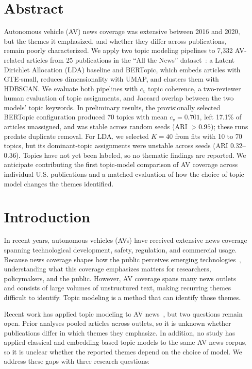 \documentclass[conference]{IEEEtran}
\begin{document}
\section*{Abstract}
Autonomous vehicle (AV) news coverage was extensive between 2016 and 2020, but the themes it emphasized, and whether they differ across publications, remain poorly characterized. We apply two topic modeling pipelines to 7,332 AV-related articles from 25 publications in the ``All the News'' dataset~\cite{mckinley2021}: a Latent Dirichlet Allocation (LDA) baseline and BERTopic, which embeds articles with GTE-small, reduces dimensionality with UMAP, and clusters them with HDBSCAN. We evaluate both pipelines with $c_v$ topic coherence, a two-reviewer human evaluation of topic assignments, and Jaccard overlap between the two models' topic keywords. In preliminary results, the provisionally selected BERTopic configuration produced 70 topics with mean $c_v=0.701$, left 17.1\% of articles unassigned, and was stable across random seeds (ARI $>0.95$); these runs predate duplicate removal. For LDA, we selected $K=40$ from fits with 10 to 70 topics, but its dominant-topic assignments were unstable across seeds (ARI 0.32--0.36). Topics have not yet been labeled, so no thematic findings are reported. We anticipate contributing the first topic-model comparison of AV coverage across individual U.S. publications and a matched evaluation of how the choice of topic model changes the themes identified.

\section*{Introduction}
In recent years, autonomous vehicles (AVs) have received extensive news coverage spanning technological development, safety, regulation, and commercial usage. Because news coverage shapes how the public perceives emerging technologies~\cite{christen2007media, anania2018effects}, understanding what this coverage emphasizes matters for researchers, policymakers, and the public. However, AV coverage spans many news outlets and consists of large volumes of unstructured text, making recurring themes difficult to identify. Topic modeling is a method that can identify those themes.

Recent work has applied topic modeling to AV news~\cite{kang2025unveiling}, but two questions remain open. Prior analyses pooled articles across outlets, so it
is unknown whether publications differ in which themes they emphasize. In addition, no study has applied classical and embedding-based topic models to the same AV news corpus, so it is unclear whether the reported themes depend on the
choice of model. We address these gaps with three research questions:
\end{document}
